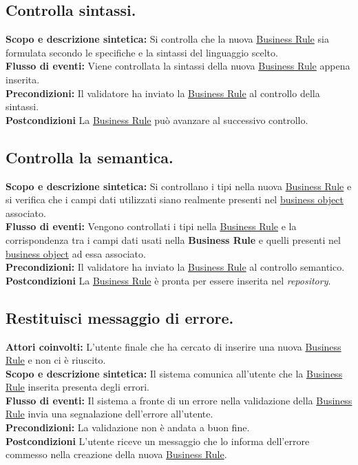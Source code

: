 \subsection{Controlla sintassi.}
\textbf{Scopo e descrizione sintetica:} Si controlla che la nuova \underline{Business Rule} sia formulata secondo le specifiche e la sintassi del linguaggio scelto.\\
\textbf{Flusso di eventi:} Viene controllata la sintassi della nuova \underline{Business Rule} appena inserita.\\
\textbf{Precondizioni:} Il validatore ha inviato la \underline{Business Rule} al controllo della sintassi.\\
\textbf{Postcondizioni} La \underline{Business Rule} pu\`o avanzare al successivo controllo.

\subsection{Controlla la semantica.}
\textbf{Scopo e descrizione sintetica:} Si controllano i tipi nella nuova \underline{Business Rule} e si verifica che i campi dati utilizzati siano realmente presenti nel \underline{business object} associato.\\
\textbf{Flusso di eventi:} Vengono controllati i tipi nella \underline{Business Rule} e la corrispondenza tra i campi dati usati nella \textbf{Business Rule} e quelli presenti nel \underline{business object} ad essa associato.\\
\textbf{Precondizioni:} Il validatore ha inviato la \underline{Business Rule} al controllo semantico.\\
\textbf{Postcondizioni} La \underline{Business Rule} \`e pronta per essere inserita nel \textit{repository}.

\subsection{Restituisci messaggio di errore.}
\textbf{Attori coinvolti:} L'utente finale che ha cercato di inserire una nuova \underline{Business Rule} e non ci \`e riuscito.\\
\textbf{Scopo e descrizione sintetica:} Il sistema comunica all'utente che la \underline{Business Rule} inserita presenta degli errori.\\
\textbf{Flusso di eventi:} Il sistema  a fronte di un errore nella validazione della \underline{Business Rule} invia una segnalazione dell'errore all'utente.\\
\textbf{Precondizioni:} La validazione non \`e andata a buon fine.\\
\textbf{Postcondizioni} L'utente riceve un messaggio che lo informa dell'errore commesso nella creazione della nuova \underline{Business Rule}.

